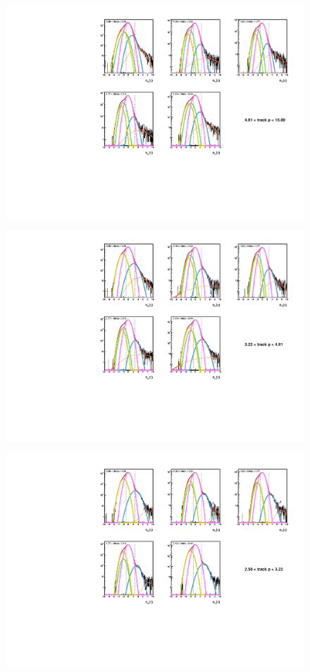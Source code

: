 \documentclass[letterpaper, abstract = on,listof=totoc, bibliography=totoc]{scrreprt}
\begin{document}
 \begin{figure}
\begin{center}
\includegraphics[width = .7\textwidth]{5gausFit_pbin_4.pdf}
\caption[]{}
\label{fig:5gaus4}
\end{center}
\end{figure}

 \begin{figure}
\begin{center}
\includegraphics[width = .7\textwidth]{5gausFit_pbin_3.pdf}
\caption[]{}
\label{fig:5gaus3}
\end{center}
\end{figure}

 \begin{figure}
\begin{center}
\includegraphics[width = .7\textwidth]{5gausFit_pbin_2.pdf}
\caption[]{}
\label{fig:5gaus2}
\end{center}
\end{figure}
\end{document}
